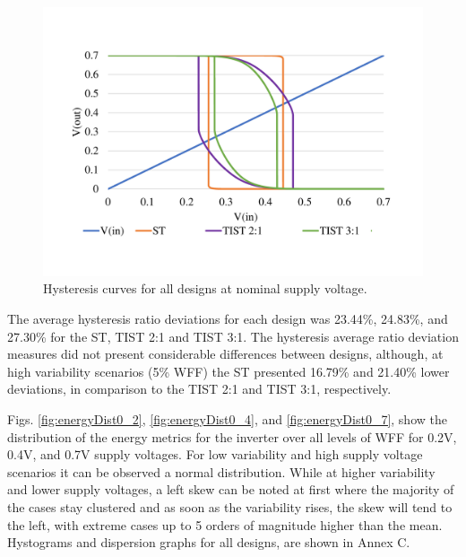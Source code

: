 \documentclass[pgmicro,mestrado,english]{iiufrgs}
\begin{document}
    \begin{figure}[]
        \centering
            \includegraphics[width=1\textwidth, trim={2cm 3cm 2cm 3cm}, clip]{hystGraphs.pdf}
            \caption{Hysteresis curves for all designs at nominal supply voltage.}
        \label{fig:hystCurves}
    \end{figure}
    
    The average hysteresis ratio deviations for each design was 23.44\%, 24.83\%, and 27.30\% for the ST, TIST 2:1 and TIST 3:1. The hysteresis average ratio deviation measures did not present considerable differences between designs, although, at high variability scenarios (5\% WFF) the ST presented 16.79\% and 21.40\% lower deviations, in comparison to the TIST 2:1 and TIST 3:1, respectively.
    
    Figs. \ref{fig:energyDist0_2}, \ref{fig:energyDist0_4}, and \ref{fig:energyDist0_7}, show the distribution of the energy metrics for the inverter over all levels of WFF for 0.2V, 0.4V, and 0.7V supply voltages. For low variability and high supply voltage scenarios it can be observed a normal distribution. While at higher variability and lower supply voltages, a left skew can be noted at first where the majority of the cases stay clustered and as soon as the variability rises, the skew will tend to the left, with extreme cases up to 5 orders of magnitude higher than the mean. Hystograms and dispersion graphs for all designs, are shown in Annex C.
    
\end{document}

